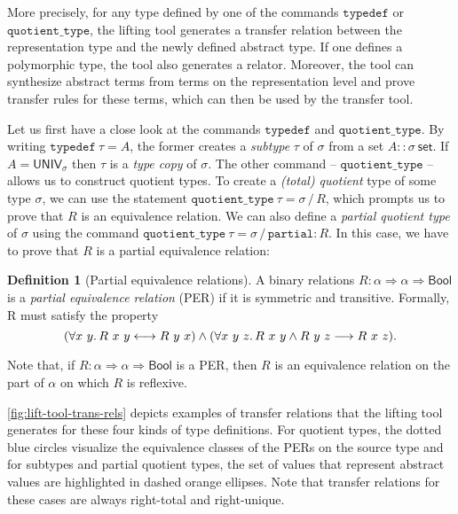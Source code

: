\documentclass{article}
\theoremstyle{definition}
\newtheorem{definition}{Definition}[section]
\newcommand{\bool}{\mathsf{Bool}}
\begin{document}
More precisely, for any type defined by one of the commands \(\mathtt{typedef}\) or \(\mathtt{quotient\_type}\),
the lifting tool generates a transfer relation between the representation type and the newly defined abstract type.
If one defines a polymorphic type,
the tool also generates a relator.
Moreover, the tool can synthesize abstract terms from terms on the representation level and prove transfer rules for these terms,
which can then be used by the transfer tool.

Let us first have a close look at the commands \(\mathtt{typedef}\) and \(\mathtt{quotient\_type}\).
By writing \(	\mathtt{typedef}\ \tau = A\),
the former creates a \emph{subtype} \(\tau\) of $\sigma$ from a set \(A :: \sigma\ \mathsf{set}\).
If \(A = \mathsf{UNIV_\sigma}\)
then \(\tau\) is a \emph{type copy} of \(\sigma\).
The other command -- \(\mathtt{quotient\_type}\) -- allows us to construct quotient types.
To create a \emph{(total) quotient} type of some type \(\sigma\),
we can use the statement \(\mathtt{quotient\_type}\ \tau = \sigma\, /\, R\),
which prompts us to prove that \(R\) is an equivalence relation.
We can also define a \emph{partial quotient type} of \(\sigma\) using the command \(\mathtt{quotient\_type}\ \tau = \sigma\, /\, \mathtt{partial} : R\).
In this case,
we have to prove that \(R\) is a partial equivalence relation:
\begin{definition}[Partial equivalence relations]
  A binary relations \(R : \alpha \Rightarrow \alpha \Rightarrow \bool\) is a \emph{partial equivalence relation} (PER) if it is symmetric and transitive. Formally, R must satisfy the property
	\begin{equation}
		(\forall x\ y\ldotp R\ x\ y \longleftrightarrow R\ y\ x) \land (\forall x\ y\ z\ldotp R\ x\ y \land R\ y\ z \longrightarrow R\ x\ z).
	\end{equation}
\end{definition}
Note that, if \(R : \alpha \Rightarrow \alpha \Rightarrow \bool\) is a PER, then \(R\) is an equivalence relation on the part of \(\alpha\) on which \(R\) is reflexive.

\cref{fig:lift-tool-trans-rels} depicts examples of transfer relations that the lifting tool generates for these four kinds of type definitions.
For quotient types, the dotted blue circles visualize the equivalence classes of the PERs on the source type
and for subtypes and partial quotient types, the set of values that represent abstract values are highlighted in dashed orange ellipses.
Note that transfer relations for these cases are always right-total and right-unique.
\end{document}
